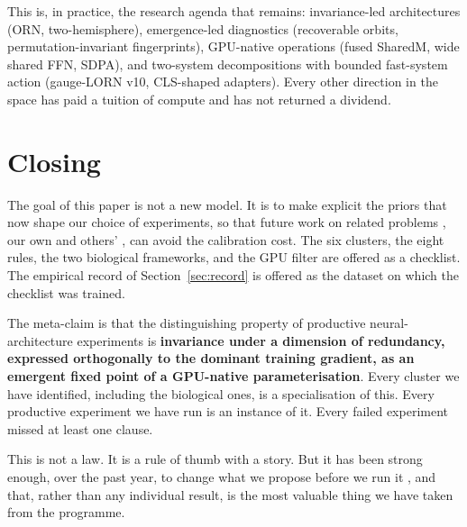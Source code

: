 \documentclass[11pt, a4paper]{article}
\begin{document}
This is, in practice, the research agenda that remains: invariance-led architectures (ORN, two-hemisphere), emergence-led diagnostics (recoverable orbits, permutation-invariant fingerprints), GPU-native operations (fused SharedM, wide shared FFN, SDPA), and two-system decompositions with bounded fast-system action (gauge-LORN v10, CLS-shaped adapters). Every other direction in the space has paid a tuition of compute and has not returned a dividend.

\section{Closing}

The goal of this paper is not a new model. It is to make explicit the priors that now shape our choice of experiments, so that future work on related problems ,  our own and others' ,  can avoid the calibration cost. The six clusters, the eight rules, the two biological frameworks, and the GPU filter are offered as a checklist. The empirical record of Section~\ref{sec:record} is offered as the dataset on which the checklist was trained.

The meta-claim is that the distinguishing property of productive neural-architecture experiments is \textbf{invariance under a dimension of redundancy, expressed orthogonally to the dominant training gradient, as an emergent fixed point of a GPU-native parameterisation}. Every cluster we have identified, including the biological ones, is a specialisation of this. Every productive experiment we have run is an instance of it. Every failed experiment missed at least one clause.

This is not a law. It is a rule of thumb with a story. But it has been strong enough, over the past year, to change what we propose before we run it ,  and that, rather than any individual result, is the most valuable thing we have taken from the programme.
\end{document}
